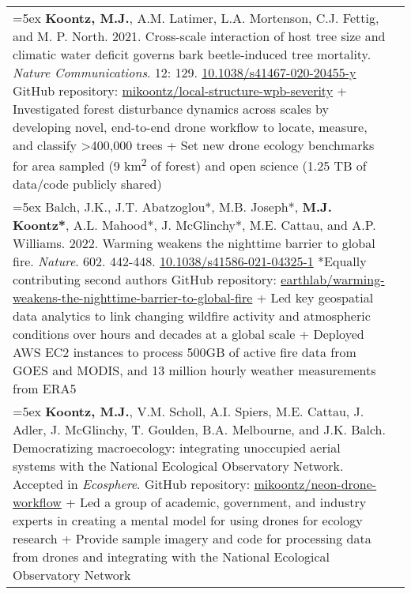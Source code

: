 \begin{longtable}{@{} >{\raggedright}p{6.10in} >{\raggedleft}X @{}}

\hangindent=5ex \textbf{Koontz, M.J.}, A.M. Latimer, L.A. Mortenson, C.J. Fettig, and M. P. North. 2021. Cross-scale interaction of host tree size and climatic water deficit governs bark beetle-induced tree mortality. \emph{Nature Communications}. 12: 129. \href{https://doi.org/10.1038/s41467-020-20455-y}{10.1038/s41467-020-20455-y}
\newline GitHub repository: \href{https://github.com/mikoontz/local-structure-wpb-severity}{mikoontz/local-structure-wpb-severity}
\newline + Investigated forest disturbance dynamics across scales by developing novel, end-to-end drone workflow to locate, measure, and classify >400,000 trees
\newline + Set new drone ecology benchmarks for area sampled (9 km\textsuperscript{2} of forest) and open science (1.25 TB of data/code publicly shared) & \tabularnewline

\hangindent=5ex Balch, J.K., J.T. Abatzoglou*, M.B. Joseph*, \textbf{M.J. Koontz*}, A.L. Mahood*, J. McGlinchy*, M.E. Cattau, and A.P. Williams. 2022. Warming weakens the nighttime barrier to global fire. \emph{Nature}. 602. 442-448. \href{https://doi.org/10.1038/s41586-021-04325-1}{10.1038/s41586-021-04325-1} *Equally contributing second authors
\newline GitHub repository: \href{https://github.com/earthlab/warming-weakens-the-nighttime-barrier-to-global-fire}{earthlab/warming-weakens-the-nighttime-barrier-to-global-fire} 
\newline + Led key geospatial data analytics to link changing wildfire activity and atmospheric conditions over hours and decades at a global scale
\newline + Deployed AWS EC2 instances to process 500GB of active fire data from GOES and MODIS, and 13 million hourly weather measurements from ERA5
& \tabularnewline

\hangindent=5ex \textbf{Koontz, M.J.}, V.M. Scholl, A.I. Spiers, M.E. Cattau, J. Adler, J. McGlinchy, T. Goulden, B.A. Melbourne, and J.K. Balch. Democratizing macroecology: integrating unoccupied aerial systems with the National Ecological Observatory Network. Accepted in \emph{Ecosphere}. 
\newline GitHub repository: \href{https://github.com/mikoontz/neon-drone-workflow}{mikoontz/neon-drone-workflow} 
\newline + Led a group of academic, government, and industry experts in creating a mental model for using drones for ecology research
\newline + Provide sample imagery and code for processing data from drones and integrating with the National Ecological Observatory Network
& \tabularnewline


\end{longtable}
